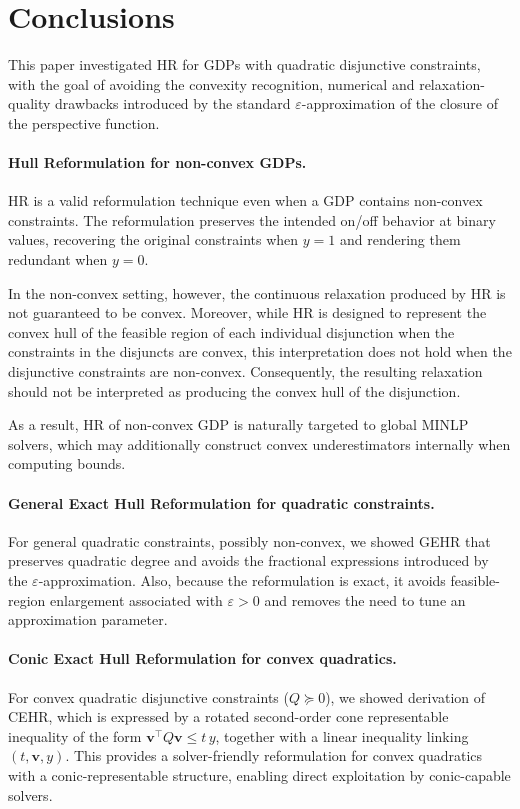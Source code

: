 \documentclass[11pt]{article}
\begin{document}
\section{Conclusions}
\label{sec:conclusion}

This paper investigated HR for GDPs with quadratic disjunctive constraints, with the goal of avoiding the convexity recognition, numerical and relaxation-quality drawbacks introduced by the standard $\varepsilon$-approximation of the closure of the perspective function.

\paragraph{Hull Reformulation for non-convex GDPs.}
HR is a valid reformulation technique even when a GDP contains non-convex constraints. The reformulation preserves the intended on/off behavior at binary values, recovering the original constraints when $y=1$ and rendering them redundant when $y=0$.

In the non-convex setting, however, the continuous relaxation produced by HR is not guaranteed to be convex. Moreover, while HR is designed to represent the convex hull of the feasible region of each individual disjunction when the constraints in the disjuncts are convex, this interpretation does not hold when the disjunctive constraints are non-convex. Consequently, the resulting relaxation should not be interpreted as producing the convex hull of the disjunction.

As a result, HR of non-convex GDP is naturally targeted to global MINLP solvers, which may additionally construct convex underestimators internally when computing bounds.



\paragraph{General Exact Hull Reformulation for quadratic constraints.}
For general quadratic constraints, possibly non-convex, we showed GEHR that preserves quadratic degree and avoids the fractional expressions introduced by the $\varepsilon$-approximation.
Also, because the reformulation is exact, it avoids feasible-region enlargement associated with $\varepsilon>0$ and removes the need to tune an approximation parameter.

\paragraph{Conic Exact Hull Reformulation for convex quadratics.}
For convex quadratic disjunctive constraints ($Q\succeq 0$), we showed derivation of CEHR, which is expressed by a rotated second-order cone representable inequality of the form $\mathbf v^\top Q \mathbf v \le t\,y$, together with a linear inequality linking $(t,\mathbf v,y)$.
This provides a solver-friendly reformulation for convex quadratics with a conic-representable structure, enabling direct exploitation by conic-capable solvers.
\end{document}
